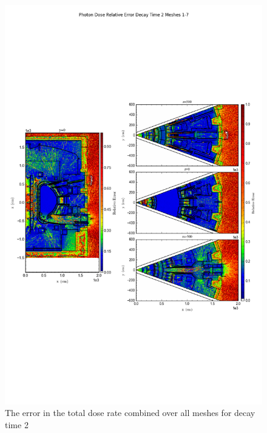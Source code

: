\documentclass[12pt]{article}
\begin{document}
\begin{figure}[ht!]
\centering
\includegraphics[trim={0cm 9cm 0cm 10cm},clip,scale=0.75]{../plots/final_model_with_b4c/Photon_Dose_Relative_Error_Decay_Time_2_Meshes_1-7.png}
\caption{The error in the total dose rate combined over all meshes for decay time 2}
\label{fig:photons_dc2_b4c_total_error}
\end{figure}
\end{document}
